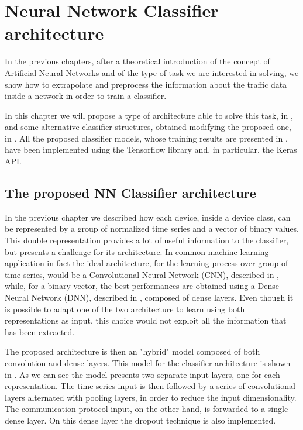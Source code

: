 \chapter{Neural Network Classifier architecture}\label{chap5}

In the previous chapters, after a theoretical introduction of the concept of Artificial Neural Networks and of the type of task we are interested in solving, we show how to extrapolate and preprocess the information about the traffic data inside a network in order to train a classifier.

In this chapter we will propose a type of architecture able to solve this task, in , and some  alternative classifier structures, obtained modifying the proposed one, in . All the proposed classifier models, whose training results are presented in , have been implemented using the Tensorflow library\cite{tf} and, in particular, the Keras API\cite{keras}. 




\section{The proposed NN Classifier architecture}\label{modelprop}

In the previous chapter we described how each device, inside a device class, can be represented by a group of normalized time series and a vector of binary values. This double representation provides a lot of useful information to the classifier, but presents a challenge for its architecture. In common machine learning application in fact the ideal architecture, for the learning process over group of time series, would be a Convolutional Neural Network (CNN), described in , while, for a binary vector, the best performances are obtained using a Dense Neural Network (DNN), described in , composed of dense layers.
Even though it is possible to adapt one of the two architecture to learn using both representations as input, this choice would not exploit all the information that has been extracted. 

The proposed architecture is then an "hybrid" model composed of both convolution and dense layers.
This model for the classifier architecture is shown in . As we can see the model presents two separate input layers, one for each representation. The time series input is then followed by a series of convolutional layers alternated with pooling layers, in order to reduce the input dimensionality. The communication protocol input, on the other hand, is forwarded to a single dense layer. On this dense layer the dropout technique is also implemented.

